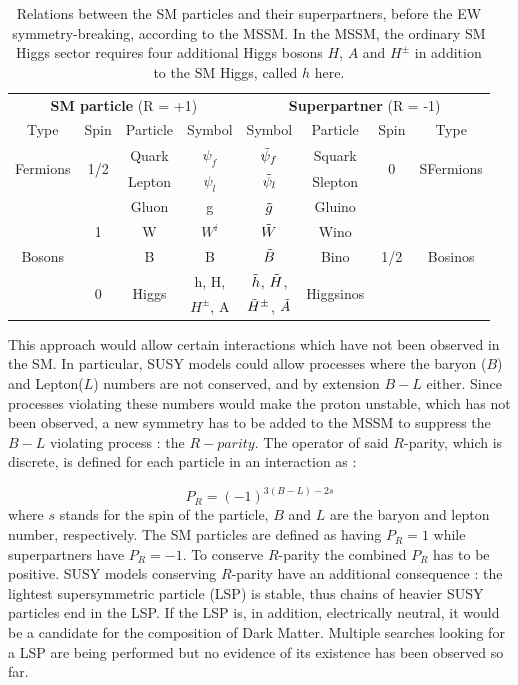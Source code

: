 \begin{table}[]
    \centering
    \caption{Relations between the SM particles and their superpartners, before the EW symmetry-breaking, according to the MSSM. In the MSSM, the ordinary SM Higgs sector requires four additional Higgs bosons $H$, $A$ and $H^{\pm}$ in addition to the SM Higgs, called $h$ here.}
    \begin{tabular}{c c c c | c c c c}
        \hline
         \multicolumn{4}{c}{\textbf{SM particle} (R = +1)} & \multicolumn{4}{c}{\textbf{Superpartner} (R = -1)} \\
        Type & Spin & Particle & Symbol & Symbol & Particle & Spin & Type \\
        \hline
        \multirow{2}{*}{Fermions} & \multirow{2}{*}{1/2} & Quark & $\psi_f$ & $\Tilde{\psi}_f$ & Squark & \multirow{2}{*}{0} & \multirow{2}{*}{SFermions} \\
         & & Lepton & $\psi_l$ & $\Tilde{\psi}_l$ & Slepton & & \\
         \hline
         \multirow{5}{*}{Bosons} & \multirow{3}{*}{1} & Gluon & g & $\Tilde{g}$
   & Gluino & \multirow{5}{*}{1/2} & \multirow{5}{*}{Bosinos} \\
          & & W & $W^i$ & $\Tilde{W}$ & Wino & & \\
          & & B & B & $\Tilde{B}$ & Bino & & \\
          & \multirow{2}{*}{0} & \multirow{2}{*}{Higgs} & h, H, & $\Tilde{h}$, $\Tilde{H}$, & \multirow{2}{*}{Higgsinos} & & \\
          & & & $H^{\pm}$, A & $\Tilde{H}^{\pm}$, $\Tilde{A}$ & & & \\ 
          \hline
    \end{tabular}
    \label{tab:superpartners}
\end{table}

This approach would allow certain interactions which have not been observed in the SM. In particular, SUSY models could allow processes where the baryon ($B$) and Lepton($L$) numbers are not conserved, and by extension $B - L$ either. Since processes violating these numbers would make the proton unstable, which has not been observed, a new symmetry has to be added to the MSSM to suppress the $B-L$ violating process : the $R-parity$. The operator of said $R$-parity, which is discrete, is defined for each particle in an interaction as :

\begin{equation}
    P_R = (-1)^{3(B-L)-2s}
\end{equation}
where $s$ stands for the spin of the particle, $B$ and $L$ are the baryon and lepton number, respectively. The SM particles are defined as having $P_R = 1$ while superpartners have $P_R = -1$. To conserve $R$-parity the combined $P_R$ has to be positive. SUSY models conserving $R$-parity have an additional consequence : the lightest supersymmetric particle (LSP) is stable, thus chains of heavier SUSY particles end in the LSP. If the LSP is, in addition, electrically neutral, it would be a candidate for the composition of Dark Matter. Multiple searches looking for a LSP are being performed but no evidence of its existence has been observed so far.\newline

